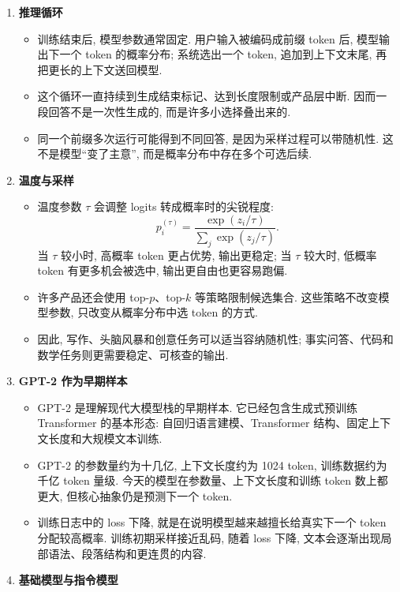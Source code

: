 \documentclass{../nndlcourse}
\begin{document}
\begin{enumerate}
  \item \textbf{推理循环}
    \begin{itemize}
      \item 训练结束后, 模型参数通常固定. 用户输入被编码成前缀 token 后, 模型输出下一个 token 的概率分布; 系统选出一个 token, 追加到上下文末尾, 再把更长的上下文送回模型.
      \item 这个循环一直持续到生成结束标记、达到长度限制或产品层中断. 因而一段回答不是一次性生成的, 而是许多小选择叠出来的.
      \item 同一个前缀多次运行可能得到不同回答, 是因为采样过程可以带随机性. 这不是模型“变了主意”, 而是概率分布中存在多个可选后续.
    \end{itemize}
  \item \textbf{温度与采样}
    \begin{itemize}
      \item 温度参数 $\tau$ 会调整 logits 转成概率时的尖锐程度:
      \[
        p_i^{(\tau)}
        =
        \frac{\exp(z_i/\tau)}{\sum_j \exp(z_j/\tau)}.
      \]
      当 $\tau$ 较小时, 高概率 token 更占优势, 输出更稳定; 当 $\tau$ 较大时, 低概率 token 有更多机会被选中, 输出更自由也更容易跑偏.
      \item 许多产品还会使用 top-$p$、top-$k$ 等策略限制候选集合. 这些策略不改变模型参数, 只改变从概率分布中选 token 的方式.
      \item 因此, 写作、头脑风暴和创意任务可以适当容纳随机性; 事实问答、代码和数学任务则更需要稳定、可核查的输出.
    \end{itemize}
  \item \textbf{GPT-2 作为早期样本}
    \begin{itemize}
      \item GPT-2 是理解现代大模型栈的早期样本. 它已经包含生成式预训练 Transformer 的基本形态: 自回归语言建模、Transformer 结构、固定上下文长度和大规模文本训练.
      \item GPT-2 的参数量约为十几亿, 上下文长度约为 1024 token, 训练数据约为千亿 token 量级. 今天的模型在参数量、上下文长度和训练 token 数上都更大, 但核心抽象仍是预测下一个 token.
      \item 训练日志中的 loss 下降, 就是在说明模型越来越擅长给真实下一个 token 分配较高概率. 训练初期采样接近乱码, 随着 loss 下降, 文本会逐渐出现局部语法、段落结构和更连贯的内容.
    \end{itemize}
  \item \textbf{基础模型与指令模型}
    \begin{itemize}

\end{itemize}
\end{enumerate}
\end{document}
